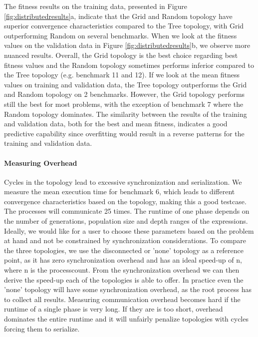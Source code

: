The fitness results on the training data, presented in Figure \ref{fig:distributedresults}a, indicate that the Grid and Random topology have superior convergence characteristics compared to the Tree topology, with Grid outperforming Random on several benchmarks. When we look at the fitness values on the validation data in Figure \ref{fig:distributedresults}b, we observe more nuanced results. Overall, the Grid topology is the best choice regarding best fitness values and the Random topology sometimes performs inferior compared to the Tree topology (e.g. benchmark 11 and 12). If we look at the mean fitness values on training and validation data, the Tree topology outperforms the Grid and Random topology on 2 benchmarks. However, the Grid topology performs still the best for most problems, with the exception of benchmark 7 where the Random topology dominates. The similarity between the results of the training and validation data, both for the best and mean fitness, indicates a good predictive capability since overfitting would result in a reverse patterns for the training and validation data.

\paragraph{Measuring Overhead}
Cycles in the topology lead to excessive synchronization and serialization. We measure the mean execution time for benchmark 6, which leads to different convergence characteristics based on the topology, making this a good testcase. The processes will communicate 25 times. 
The runtime of one phase depends on the number of generations, population size and depth ranges of the expressions. 
Ideally, we would like for a user to choose these parameters based on the problem at hand and not be constrained by synchronization considerations. To compare the three topologies, we use the disconnected or 'none' topology as a reference point, as it has zero synchronization overhead and has an ideal speed-up of n, where n is the processcount. From the synchronization overhead we can then derive the speed-up each of the topologies is able to offer. In practice even the 'none' topology will have some synchronization overhead, as the root process has to collect all results.
Measuring communication overhead becomes hard if the runtime of a single phase is very long. If they are is too short, overhead dominates the entire runtime and it will unfairly penalize topologies with cycles forcing them to serialize. 

